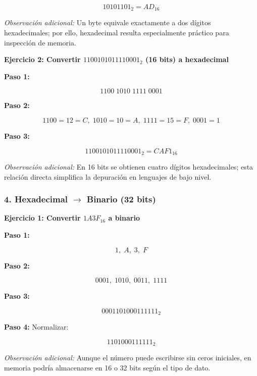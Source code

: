 \documentclass[12pt,twoside]{book}
\begin{document}
						\[
						10101101_2 = AD_{16}
						\]
						
						\noindent
						\emph{Observación adicional:} Un byte equivale exactamente a dos dígitos hexadecimales; por ello, hexadecimal resulta especialmente práctico para inspección de memoria.
						
						\bigskip
						
						\noindent
						\textbf{Ejercicio 2: Convertir $1100101011110001_2$ (16 bits) a hexadecimal}
						
						\noindent
						\textbf{Paso 1:}
						
						\[
						1100\;1010\;1111\;0001
						\]
						
						\noindent
						\textbf{Paso 2:}
						
						\[
						1100=12=C,\;1010=10=A,\;1111=15=F,\;0001=1
						\]
						
						\noindent
						\textbf{Paso 3:}
						
						\[
						1100101011110001_2 = CAF1_{16}
						\]
						
						\noindent
						\emph{Observación adicional:} En 16 bits se obtienen cuatro dígitos hexadecimales; esta relación directa simplifica la depuración en lenguajes de bajo nivel.
						
						\subsubsection*{4. Hexadecimal $\rightarrow$ Binario (32 bits)}
						
						\noindent
						\textbf{Ejercicio 1: Convertir $1A3F_{16}$ a binario}
						
						\noindent
						\textbf{Paso 1:}
						
						\[
						1,\;A,\;3,\;F
						\]
						
						\noindent
						\textbf{Paso 2:}
						
						\[
						0001,\;1010,\;0011,\;1111
						\]
						
						\noindent
						\textbf{Paso 3:}
						
						\[
						0001101000111111_2
						\]
						
						\noindent
						\textbf{Paso 4:} Normalizar:
						
						\[
						1101000111111_2
						\]
						
						\noindent
						\emph{Observación adicional:} Aunque el número puede escribirse sin ceros iniciales, en memoria podría almacenarse en 16 o 32 bits según el tipo de dato.
						
\end{document}
